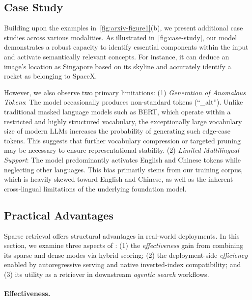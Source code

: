 \subsection{Case Study} \label{sec:case-study}
Building upon the examples in~\autoref{fig:arxiv-figure1}(b), we present additional case studies across various modalities. As illustrated in~\autoref{fig:case-study}, our model demonstrates a robust capacity to identify essential components within the input and activate semantically relevant concepts. For instance, it can deduce an image's location as Singapore based on its skyline and accurately identify a rocket as belonging to SpaceX.

However, we also observe two primary limitations:
(1) \emph{Generation of Anomalous Tokens}: The model occasionally produces non-standard tokens (\eg ``\_alt''). Unlike traditional masked language models such as BERT, which operate within a restricted and highly structured vocabulary, the exceptionally large vocabulary size of modern LLMs increases the probability of generating such edge-case tokens. This suggests that further vocabulary compression or targeted pruning may be necessary to ensure representational stability. 
(2) \emph{Limited Multilingual Support}: The model predominantly activates English and Chinese tokens while neglecting other languages. This bias primarily stems from our training corpus, which is heavily skewed toward English and Chinese, as well as the inherent cross-lingual limitations of the underlying foundation model. 


\subsection{Practical Advantages}

Sparse retrieval offers structural advantages in real-world deployments. In this section, we examine three aspects of \ours: (1) the \emph{effectiveness} gain from combining its sparse and dense modes via hybrid scoring; (2) the deployment-side \emph{efficiency} enabled by autoregressive serving and native inverted-index compatibility; and (3) its utility as a retriever in downstream \emph{agentic search} workflows.

\paragraph{Effectiveness.} \label{sec:effectiveness}

